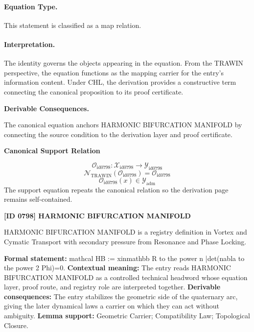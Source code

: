 \paragraph{Equation Type.}
This statement is classified as a map relation.

\paragraph{Interpretation.}
The identity governs the objects appearing in the equation. From the TRAWIN perspective, the equation functions as the mapping carrier for the entry’s information content. Under CHL, the derivation provides a constructive term connecting the canonical proposition to its proof certificate.

\par\vspace{0.35em}
\noindent\textbf{Derivable Consequences.}\quad
\begingroup
\footnotesize
\raggedright
The canonical equation anchors HARMONIC BIFURCATION MANIFOLD by connecting the source condition to the derivation layer and proof certificate.
\par\endgroup

\noindent\textbf{Canonical Support Relation}\par
\[
\mathcal{O}_{\mathrm{id0798}}:\mathcal{X}_{\mathrm{id0798}}\longrightarrow\mathcal{Y}_{\mathrm{id0798}}
\]
\[
\mathcal{N}_{\mathrm{TRAWIN}}(\mathcal{O}_{\mathrm{id0798}})=\mathcal{O}_{\mathrm{id0798}}
\]
\[
\mathcal{O}_{\mathrm{id0798}}(x)\in\mathcal{Y}_{\mathrm{adm}}
\]
\noindent The support equation repeats the canonical relation so the derivation page remains self-contained.\par

\clearpage
\noindent\textbf{[ID 0798] HARMONIC BIFURCATION MANIFOLD}\par
\vspace{0.35em}
\begingroup\small
{}
HARMONIC BIFURCATION MANIFOLD is a registry definition in Vortex and Cymatic Transport with secondary pressure from Resonance and Phase Locking.

\begingroup\footnotesize\setlength{\emergencystretch}{3em}\sloppy
\textbf{Formal statement:} mathcal HB := xinmathbb R to the power n |det(nabla to the power 2 Phi)=0. \textbf{Contextual meaning:} The entry reads HARMONIC BIFURCATION MANIFOLD as a controlled technical headword whose equation layer, proof route, and registry role are interpreted together. \textbf{Derivable consequences:} The entry stabilizes the geometric side of the quaternary arc, giving the later dynamical laws a carrier on which they can act without ambiguity. \textbf{Lemma support:} Geometric Carrier; Compatibility Law; Topological Closure.\par
\endgroup

